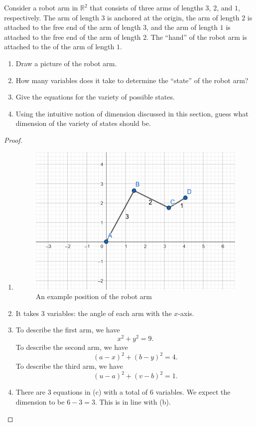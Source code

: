 \begin{exercise}{13}
Consider a robot arm in $\mathbb{R}^2$ that consists of three arms of lengths $3$, $2$, and $1$, respectively. The arm of length $3$ is anchored at the origin, the arm of length $2$ is attached to the free end of the arm of length $3$, and the arm of length $1$ is attached to the free end of the arm of length $2$. The ``hand'' of the robot arm is attached to the of the arm of length $1$.
\begin{enumerate}
    \item Draw a picture of the robot arm.
    \item How many variables does it take to determine the ``state'' of the robot arm?
    \item Give the equations for the variety of possible states.
    \item Using the intuitive notion of dimension discussed in this section, guess what dimension of the variety of states should be.
\end{enumerate}
\end{exercise}
\begin{proof}
    \begin{enumerate}
        \item 
\begin{figure}[H]
        \centering
        \includegraphics[width=0.5\linewidth]{cox-little-oshea/assets/sec1-2-ex13.png}
        \caption{An example position of the robot arm}
        \label{fig:sec1-2-ex13}
    \end{figure}
    \item It takes $3$ variables: the angle of each arm with the $x$-axis.
    \item To describe the first arm, we have
    $$x^2 + y^2 = 9.$$
    To describe the second arm, we have
    $$(a-x)^2 + (b-y)^2 = 4.$$
    To describe the third arm, we have
    $$(u-a)^2 + (v-b)^2 = 1.$$
    \item There are $3$ equations in (c) with a total of $6$ variables. We expect the dimension to be $6-3 = 3$. This is in line with (b).
\end{enumerate}
\end{proof}

